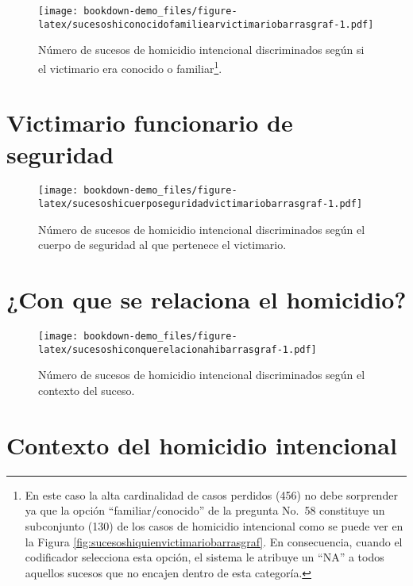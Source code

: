 \documentclass[
]{book}
\begin{document}
\begin{figure}
\centering
\texttt{[image: bookdown-demo\_files/figure-latex/sucesoshiconocidofamiliearvictimariobarrasgraf-1.pdf]}
\caption{\label{fig:sucesoshiconocidofamiliearvictimariobarrasgraf}Número de sucesos de homicidio intencional discriminados según si el victimario era conocido o familiar\footnote{En este caso la alta cardinalidad de casos perdidos (456) no debe sorprender ya que la opción ``familiar/conocido'' de la pregunta No.~58 constituye un subconjunto (130) de los casos de homicidio intencional como se puede ver en la Figura \ref{fig:sucesoshiquienvictimariobarrasgraf}. En consecuencia, cuando el codificador selecciona esta opción, el sistema le atribuye un ``NA'' a todos aquellos sucesos que no encajen dentro de esta categoría.}.}
\end{figure}

\hypertarget{victimario-funcionario-de-seguridad}{%
\section{Victimario funcionario de seguridad}\label{victimario-funcionario-de-seguridad}}



\begin{figure}
\centering
\texttt{[image: bookdown-demo\_files/figure-latex/sucesoshicuerposeguridadvictimariobarrasgraf-1.pdf]}
\caption{\label{fig:sucesoshicuerposeguridadvictimariobarrasgraf}Número de sucesos de homicidio intencional discriminados según el cuerpo de seguridad al que pertenece el victimario.}
\end{figure}

\hypertarget{con-que-se-relaciona-el-homicidio}{%
\section{¿Con que se relaciona el homicidio?}\label{con-que-se-relaciona-el-homicidio}}



\begin{figure}
\centering
\texttt{[image: bookdown-demo\_files/figure-latex/sucesoshiconquerelacionahibarrasgraf-1.pdf]}
\caption{\label{fig:sucesoshiconquerelacionahibarrasgraf}Número de sucesos de homicidio intencional discriminados según el contexto del suceso.}
\end{figure}

\hypertarget{contexto-del-homicidio-intencional}{%
\section{Contexto del homicidio intencional}\label{contexto-del-homicidio-intencional}}
\end{document}
